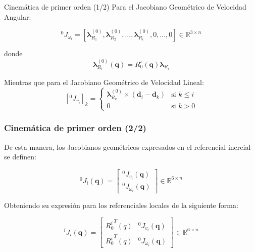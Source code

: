 \begin{frame}{Cinemática de primer orden (1/2)}
    Para el Jacobiano Geométrico de Velocidad Angular:
    
    \begin{equation}
        ^0J_{\omega_i} =
        \left[\boldsymbol{\lambda}^{(0)}_{R_1}, \boldsymbol{\lambda}^{(0)}_{R_2}, \ldots, \boldsymbol{\lambda}^{(0)}_{R_i}, 0,\ldots, 0\right]
        \in \mathbb{R}^{3\times n}
        \label{eq:Jw}
    \end{equation}
    
    donde 
    \begin{equation}
        \boldsymbol{\lambda}^{(0)}_{R_i}(\boldsymbol{q}) = R^i_0(\boldsymbol{q})\boldsymbol{\lambda}_{R_i}
    \end{equation}
    
    Mientras que para el Jacobiano Geométrico de Velocidad Lineal: 
    \begin{equation}
        \left[^0J_{v_i}\right]_k =
        \begin{cases}
            \boldsymbol{\lambda}^{(0)}_{R_k} \times (\boldsymbol{d}_i - \boldsymbol{d}_k) & \text{si } k \leq i \\
            0                                                          & \text{si } k > 0
        \end{cases}
    \end{equation}
\end{frame}

\begin{frame}
    \frametitle{Cinemática de primer orden (2/2)}
    De esta manera, los Jacobianos geométricos expresados en el referencial 
    inercial se definen:

    \begin{equation}
        {^0}{}J_i(\boldsymbol{q}) = 
        \begin{bmatrix}
            {^0}{}J_{v_i}(\boldsymbol{q}) \\
            {^0}{}J_{\omega_i}(\boldsymbol{q})
        \end{bmatrix}
        \in \mathbb{R}^{6\times n}
    \end{equation}

    Obteniendo su expresión para los referenciales locales de la siguiente 
    forma:

    \begin{equation}
        {^i}{}J_i(\boldsymbol{q}) =
        \begin{bmatrix}
            {R^i_0}^T(q)  & {^0}{}J_{v_i}(\boldsymbol{q}) \\
            {R^i_0}^T(q) & {^0}{}J_{\omega_i}(\boldsymbol{q})
        \end{bmatrix} 
        \in \mathbb{R}^{6\times n} 
    \end{equation}

\end{frame}

